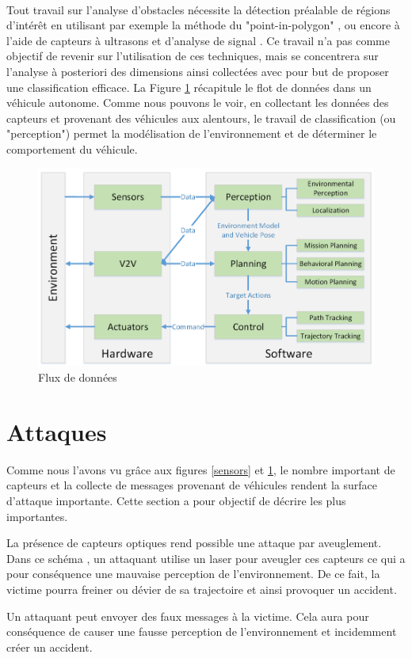 \documentclass[a4paper]{report}
\begin{document}
~\par

Tout travail sur l'analyse d'obstacles nécessite la détection préalable de régions d'intérêt en utilisant par exemple la méthode du "point-in-polygon" \cite{ref1}, ou encore à l'aide de capteurs à ultrasons et d'analyse de signal \cite{ref2}. Ce travail n'a pas comme objectif de revenir sur l'utilisation de ces techniques, mais se concentrera sur l'analyse à posteriori des dimensions ainsi collectées avec pour but de proposer une classification efficace. La Figure \ref{data_flow} récapitule le flot de données dans un véhicule autonome. Comme nous pouvons le voir, en collectant les données des capteurs et provenant des véhicules aux alentours, le travail de classification (ou "perception") permet la modélisation de l'environnement et de déterminer le comportement du véhicule. 

\begin{figure}
	\centering
	\includegraphics[width=.9\textwidth]{img/data_flow.png}
	\caption{Flux de données\label{data_flow}}
\end{figure}

\section{Attaques}

Comme nous l'avons vu grâce aux figures \ref{sensors} et \ref{data_flow}, le nombre important de capteurs et la collecte de messages provenant de véhicules rendent la surface d'attaque importante. Cette section a pour objectif de décrire les plus importantes.

\begin{description}\setlength{\itemsep}{1.5mm}
\item[Attaque par aveuglement des capteurs] La présence de capteurs optiques rend possible une attaque par aveuglement. Dans ce schéma \cite{blinding}, un attaquant utilise un laser pour aveugler ces capteurs ce qui a pour conséquence une mauvaise perception de l'environnement. De ce fait, la victime pourra freiner ou dévier de sa trajectoire et ainsi provoquer un accident. 
\item[Attaque par modification] Un attaquant peut envoyer des faux messages à la victime. Cela aura pour conséquence de causer une fausse perception de l'environnement et incidemment créer un accident.
\end{description}
\end{document}

